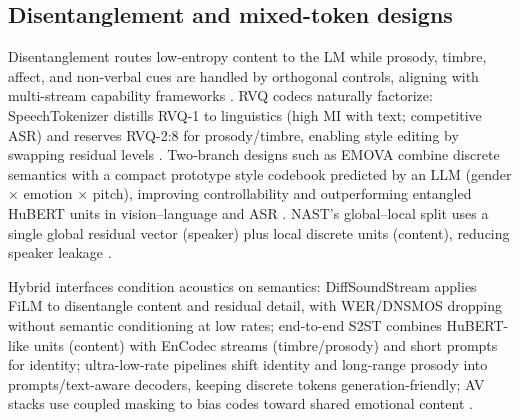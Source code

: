 \documentclass{article}
\begin{document}
\subsection{Disentanglement and mixed-token designs} \label{subsec:disentanglementandmixed-tokendesigns}
Disentanglement routes low-entropy content to the LM while prosody, timbre, affect, and non-verbal cues are handled by orthogonal controls, aligning with multi-stream capability frameworks \cite{wang2025bossbeyondsemanticspeech,guo2025recentadvancesdiscretespeechtokensreview}. RVQ codecs naturally factorize: SpeechTokenizer distills RVQ-1 to linguistics (high MI with text; competitive ASR) and reserves RVQ-2:8 for prosody/timbre, enabling style editing by swapping residual levels \cite{zhang2024speechtokenizerunifiedspeechtokenizerlar}. Two-branch designs such as EMOVA combine discrete semantics with a compact prototype style codebook predicted by an LLM (gender $\times$ emotion $\times$ pitch), improving controllability and outperforming entangled HuBERT units in vision--language and ASR \cite{chen2025emovaempoweringlanguagemodelsseehearspea}. NAST's global--local split uses a single global residual vector (speaker) plus local discrete units (content), reducing speaker leakage \cite{messica2024nastnoiseawarespeechtokenizationlanguage}.

Hybrid interfaces condition acoustics on semantics: DiffSoundStream applies FiLM to disentangle content and residual detail, with WER/DNSMOS dropping without semantic conditioning at low rates; end-to-end S2ST combines HuBERT-like units (content) with EnCodec streams (timbre/prosody) and short prompts for identity; ultra-low-rate pipelines shift identity and long-range prosody into prompts/text-aware decoders, keeping discrete tokens generation-friendly; AV stacks use coupled masking to bias codes toward shared emotional content \cite{yang2025diffsoundstreamefficientspeechtokenizati,peng2024mslms2stmultitaskspeechlanguagemodeltext,wang2025tadicodectextawarediffusionspeechtokeniz,sadok2025vectorquantizedmaskedautoencoderaudiovis}.
\end{document}
